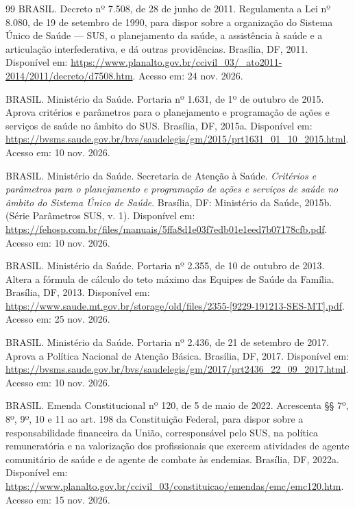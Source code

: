 \documentclass[12pt,a4paper,oneside]{report}
\begin{document}
\begin{thebibliography}{99}
BRASIL. Decreto nº 7.508, de 28 de junho de 2011. Regulamenta a Lei nº 8.080, de 19 de setembro de 1990, para dispor sobre a organização do Sistema Único de Saúde --- SUS, o planejamento da saúde, a assistência à saúde e a articulação interfederativa, e dá outras providências. Brasília, DF, 2011. Disponível em: \url{https://www.planalto.gov.br/ccivil_03/_ato2011-2014/2011/decreto/d7508.htm}. Acesso em: 24 nov. 2026.

BRASIL. Ministério da Saúde. Portaria nº 1.631, de 1º de outubro de 2015. Aprova critérios e parâmetros para o planejamento e programação de ações e serviços de saúde no âmbito do SUS. Brasília, DF, 2015a. Disponível em: \url{https://bvsms.saude.gov.br/bvs/saudelegis/gm/2015/prt1631_01_10_2015.html}. Acesso em: 10 nov. 2026.

BRASIL. Ministério da Saúde. Secretaria de Atenção à Saúde. \textit{Critérios e parâmetros para o planejamento e programação de ações e serviços de saúde no âmbito do Sistema Único de Saúde}. Brasília, DF: Ministério da Saúde, 2015b. (Série Parâmetros SUS, v. 1). Disponível em: \url{https://fehosp.com.br/files/manuais/5ffa8d1e03f7edb01e1eed7b07178cfb.pdf}. Acesso em: 10 nov. 2026.

BRASIL. Ministério da Saúde. Portaria nº 2.355, de 10 de outubro de 2013. Altera a fórmula de cálculo do teto máximo das Equipes de Saúde da Família. Brasília, DF, 2013. Disponível em: \url{https://www.saude.mt.gov.br/storage/old/files/2355-[9229-191213-SES-MT].pdf}. Acesso em: 25 nov. 2026.

BRASIL. Ministério da Saúde. Portaria nº 2.436, de 21 de setembro de 2017. Aprova a Política Nacional de Atenção Básica. Brasília, DF, 2017. Disponível em: \url{https://bvsms.saude.gov.br/bvs/saudelegis/gm/2017/prt2436_22_09_2017.html}. Acesso em: 10 nov. 2026.

BRASIL. Emenda Constitucional nº 120, de 5 de maio de 2022. Acrescenta §§ 7º, 8º, 9º, 10 e 11 ao art. 198 da Constituição Federal, para dispor sobre a responsabilidade financeira da União, corresponsável pelo SUS, na política remuneratória e na valorização dos profissionais que exercem atividades de agente comunitário de saúde e de agente de combate às endemias. Brasília, DF, 2022a. Disponível em: \url{https://www.planalto.gov.br/ccivil_03/constituicao/emendas/emc/emc120.htm}. Acesso em: 15 nov. 2026.


\end{thebibliography}
\end{document}

